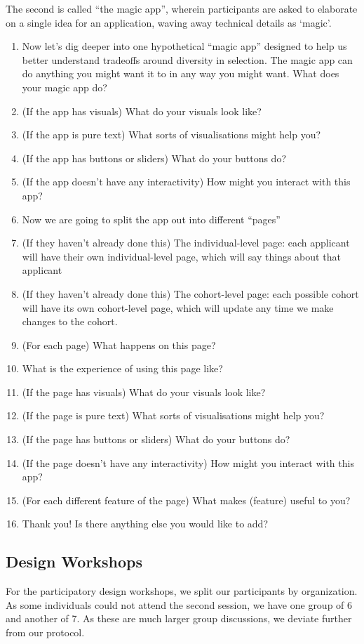 The second is called ``the magic app'', wherein participants are asked to elaborate on a single idea for an application, waving away technical details as `magic'.

\begin{enumerate}
    \item Now let's dig deeper into one hypothetical “magic app” designed to help us better understand tradeoffs around diversity in selection. The magic app can do anything you might want it to in any way you might want. What does your magic app do?
    \item (If the app has visuals) What do your visuals look like?
    \item (If the app is pure text) What sorts of visualisations might help you?
    \item (If the app has buttons or sliders) What do your buttons do?
    \item (If the app doesn't have any interactivity) How might you interact with this app?
    \item Now we are going to split the app out into different “pages”
    \item (If they haven't already done this) The individual-level page: each applicant will have their own individual-level page, which will say things about that applicant
    \item (If they haven't already done this) The cohort-level page: each possible cohort will have its own cohort-level page, which will update any time we make changes to the cohort.
    \item (For each page) What happens on this page?
    \item What is the experience of using this page like?
    \item (If the page has visuals) What do your visuals look like?
    \item (If the page is pure text) What sorts of visualisations might help you?
    \item (If the page has buttons or sliders) What do your buttons do?
    \item (If the page doesn't have any interactivity) How might you interact with this app?
    \item (For each different feature of the page) What makes (feature) useful to you?
    \item Thank you! Is there anything else you would like to add?
\end{enumerate}

\subsection{Design Workshops}
For the participatory design workshops, we split our participants by organization. As some individuals could not attend the second session, we have one group of 6 and another of 7. As these are much larger group discussions, we deviate further from our protocol.

